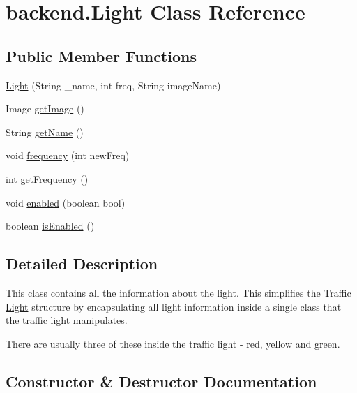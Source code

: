 \hypertarget{classbackend_1_1_light}{}\section{backend.\+Light Class Reference}
\label{classbackend_1_1_light}
\subsection*{Public Member Functions}
\begin{DoxyCompactItemize}
\item 
\hyperlink{classbackend_1_1_light_ae178ed543c16a272525f125b546bcdc7}{Light} (String \+\_\+name, int freq, String image\+Name)
\item 
Image \hyperlink{classbackend_1_1_light_ad532db1f7e6546f1eb4c760f84d3092f}{get\+Image} ()
\item 
String \hyperlink{classbackend_1_1_light_afb407ae3e7f06bcd31ba9804bf93a650}{get\+Name} ()
\item 
void \hyperlink{classbackend_1_1_light_a3d80e153d8b8040dc407e9a38a7c056a}{frequency} (int new\+Freq)
\item 
int \hyperlink{classbackend_1_1_light_ae6e17df986c1ebb3bb23d551ff56237b}{get\+Frequency} ()
\item 
void \hyperlink{classbackend_1_1_light_a7c32c5e1c8a2e62d3022803ceb31f9cf}{enabled} (boolean bool)
\item 
boolean \hyperlink{classbackend_1_1_light_a012219634e4d5e30adc50b5a96b405b7}{is\+Enabled} ()
\end{DoxyCompactItemize}


\subsection{Detailed Description}
This class contains all the information about the light. This simplifies the Traffic \hyperlink{classbackend_1_1_light}{Light} structure by encapsulating all light information inside a single class that the traffic light manipulates.

There are usually three of these inside the traffic light -\/ red, yellow and green. 

\subsection{Constructor \& Destructor Documentation}
